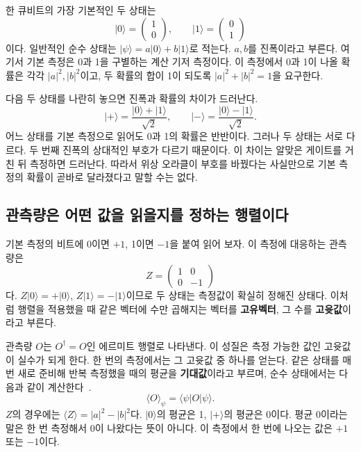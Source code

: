 한 큐비트의 가장 기본적인 두 상태는
\[
\lvert0\rangle=\begin{pmatrix}1\\0\end{pmatrix},\qquad
\lvert1\rangle=\begin{pmatrix}0\\1\end{pmatrix}
\]
이다. 일반적인 순수 상태는
\(\lvert\psi\rangle=a\lvert0\rangle+b\lvert1\rangle\)로 적는다.
\(a,b\)를 진폭이라고 부른다. 여기서 기본 측정은 0과 1을 구별하는 계산 기저 측정이다.
이 측정에서 0과 1이 나올 확률은 각각
\(\lvert a\rvert^2,\lvert b\rvert^2\)이고, 두 확률의 합이 1이 되도록
\(\lvert a\rvert^2+\lvert b\rvert^2=1\)을 요구한다.

다음 두 상태를 나란히 놓으면 진폭과 확률의 차이가 드러난다.
\[
\lvert+\rangle=\frac{\lvert0\rangle+\lvert1\rangle}{\sqrt2},\qquad
\lvert-\rangle=\frac{\lvert0\rangle-\lvert1\rangle}{\sqrt2}.
\]
어느 상태를 기본 측정으로 읽어도 0과 1의 확률은 반반이다. 그러나 두 상태는 서로 다르다.
두 번째 진폭의 상대적인 부호가 다르기 때문이다. 이 차이는 알맞은 게이트를 거친 뒤
측정하면 드러난다. 따라서 위상 오라클이 부호를 바꿨다는 사실만으로 기본 측정의
확률이 곧바로 달라졌다고 말할 수는 없다.

\subsection{관측량은 어떤 값을 읽을지를 정하는 행렬이다}

기본 측정의 비트에 0이면 \(+1\), 1이면 \(-1\)을 붙여 읽어 보자.
이 측정에 대응하는 관측량은
\[
Z=\begin{pmatrix}1&0\\0&-1\end{pmatrix}
\]
다. \(Z\lvert0\rangle=+\lvert0\rangle\),
\(Z\lvert1\rangle=-\lvert1\rangle\)이므로 두 상태는 측정값이 확실히 정해진 상태다.
이처럼 행렬을 적용했을 때 같은 벡터에 수만 곱해지는 벡터를 \textbf{고유벡터},
그 수를 \textbf{고윳값}이라고 부른다.

관측량 \(O\)는 \(O^\dagger=O\)인 에르미트 행렬로 나타낸다.
이 성질은 측정 가능한 값인 고윳값이 실수가 되게 한다.
한 번의 측정에서는 그 고윳값 중 하나를 얻는다. 같은 상태를 매번 새로 준비해
반복 측정했을 때의 평균을 \textbf{기대값}이라고 부르며,
순수 상태에서는 다음과 같이 계산한다~\cite{preskill}.
\[
\langle O\rangle_\psi=\langle\psi\rvert O\lvert\psi\rangle.
\]
\(Z\)의 경우에는 \(\langle Z\rangle=\lvert a\rvert^2-\lvert b\rvert^2\)다.
\(\lvert0\rangle\)의 평균은 1, \(\lvert+\rangle\)의 평균은 0이다.
평균 0이라는 말은 한 번 측정해서 0이 나왔다는 뜻이 아니다.
이 측정에서 한 번에 나오는 값은 \(+1\) 또는 \(-1\)이다.

